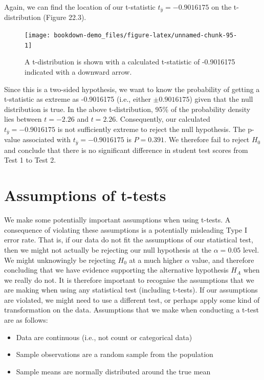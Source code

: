 \documentclass[
]{scrbook}
\providecommand{\tightlist}{%
  \setlength{\itemsep}{0pt}\setlength{\parskip}{0pt}}
\begin{document}
Again, we can find the location of our t-statistic \(t_{\bar{y}} = -0.9016175\) on the t-distribution (Figure 22.3).

\begin{figure}
\texttt{[image: bookdown-demo\_files/figure-latex/unnamed-chunk-95-1]} \caption{A t-distribution is shown with a calculated t-statistic of -0.9016175 indicated with a downward arrow.}\label{fig:unnamed-chunk-95}
\end{figure}

Since this is a two-sided hypothesis, we want to know the probability of getting a t-statistic as extreme as -0.9016175 (i.e., either \(\pm 0.9016175\)) given that the null distribution is true.
In the above t-distribution, 95\% of the probability density lies between \(t = -2.26\) and \(t = 2.26\).
Consequently, our calculated \(t_{\bar{y}} = -0.9016175\) is not sufficiently extreme to reject the null hypothesis.
The p-value associated with \(t_{\bar{y}} = -0.9016175\) is \(P = 0.391\).
We therefore fail to reject \(H_{0}\) and conclude that there is no significant difference in student test scores from Test 1 to Test 2.

\hypertarget{assumptions-of-t-tests}{%
\section{Assumptions of t-tests}\label{assumptions-of-t-tests}}

We make some potentially important assumptions when using t-tests.
A consequence of violating these assumptions is a potentially misleading Type I error rate.
That is, if our data do not fit the assumptions of our statistical test, then we might not actually be rejecting our null hypothesis at the \(\alpha = 0.05\) level.
We might unknowingly be rejecting \(H_{0}\) at a much higher \(\alpha\) value, and therefore concluding that we have evidence supporting the alternative hypothesis \(H_{A}\) when we really do not.
It is therefore important to recognise the assumptions that we are making when using any statistical test (including t-tests).
If our assumptions are violated, we might need to use a different test, or perhaps apply some kind of transformation on the data.
Assumptions that we make when conducting a t-test are as follows:

\begin{itemize}
\tightlist
\item
  Data are continuous (i.e., not count or categorical data)
\item
  Sample observations are a random sample from the population
\item
  Sample means are normally distributed around the true mean
\end{itemize}
\end{document}
